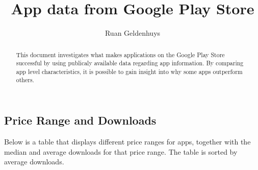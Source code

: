 \documentclass[11pt,preprint, authoryear]{elsarticle}
\numberwithin{equation}{section}
\numberwithin{figure}{section}
\numberwithin{table}{section}
\begin{document}
\begin{frontmatter}  %

\title{App data from Google Play Store}





\author[Add1]{Ruan Geldenhuys}





\address[Add1]{Stellenbosch University, Stellenbosch, South Africa}


\begin{abstract}
\small{
This document investigates what makes applications on the Google Play
Store successful by using publicaly available data regarding app
information. By comparing app level characteristics, it is possible to
gain insight into why some apps outperform others.
}
\end{abstract}

\vspace{1cm}





\vspace{0.5cm}

\end{frontmatter}



\pagestyle{fancy}
\chead{}
\rhead{}
\lfoot{}
\rfoot{}
\lhead{}
\cfoot{}


\headsep 35pt %




\hypertarget{price-range-and-downloads}{%
\subsection{Price Range and Downloads}\label{price-range-and-downloads}}

Below is a table that displays different price ranges for apps, together
with the median and average downloads for that price range. The table is
sorted by average downloads.
\end{document}
